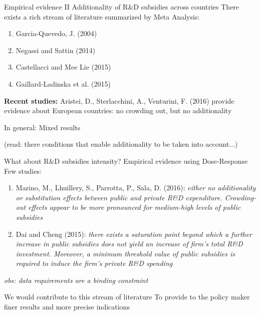 \documentclass[10pt,handout,xcolor=pdftex,dvipsnames,table]{beamer}
\begin{document}
\begin{frame}{Empirical evidence II}
{Additionality of R\&D subsidies across countries}
There exists a rich stream of literature summarized by Meta Analysis: 
\begin{enumerate}
\item Garcia-Quevedo, J. (2004) 
\item Negassi and Sattin (2014)
\item Castellacci and Mee Lie (2015)
\item Gaillard-Ladinska et al. (2015)
\end{enumerate}
{\bf Recent studies:} 
Aristei, D., Sterlacchini, A., Venturini, F. (2016) provide evidence about European countries: no crowding out, but no additionality


In general: Mixed results 

(read: there conditions that enable additionality to be taken into account...)

\end{frame}
\begin{frame}{What about R\&D subsidies intensity?}
{Empirical evidence using Dose-Response}
Few studies: 
\begin{enumerate}
\item Marino, M., Lhuillery, S., Parrotta, P., Sala, D. (2016): 
{\it either no additionality or substitution effects between public and private R\&D expenditure. Crowding-out effects appear to be more pronounced for medium-high levels of public subsidies}
\item Dai and Cheng (2015): {\it there exists a saturation point beyond which a further increase in public subsidies does not yield an increase of firm's total R\&D investment. Moreover, a minimum threshold value of public subsidies is required to induce the firm's private R\&D spending}
\end{enumerate}

{\it obs: data requirements are a binding constraint}

\begin{block}{ We would contribute to this stream of literature}
To provide to the policy maker finer results and more precise indications
\end{block}

\end{frame}
\end{document}

